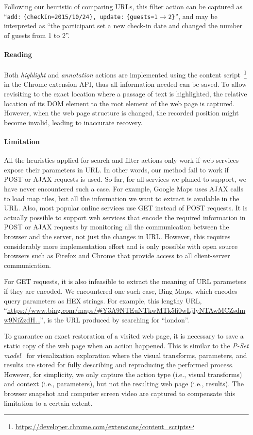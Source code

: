Following our heuristic of comparing URLs, this filter action can be captured as ``\texttt{add:} \texttt{\{checkIn=2015/10/24\}, update:} \texttt{\{guests=1$\rightarrow$2\}}'', and may be interpreted as ``the participant set a new check-in date and changed the number of guests from 1 to 2''.

\paragraph{Reading} Both \emph{highlight} and \emph{annotation} actions are implemented using the content script~\footnote{\url{https://developer.chrome.com/extensions/content_scripts}} in the Chrome extension API, thus all information needed can be saved. To allow revisiting to the exact location where a passage of text is highlighted, the relative location of its DOM element to the root element of the web page is captured. However, when the web page structure is changed, the recorded position might become invalid, leading to inaccurate recovery.

\paragraph{Limitation} All the heuristics applied for search and filter actions only work if web services expose their parameters in URL. In other words, our method fail to work if POST or AJAX requests is used. So far, for all services we planed to support, we have never encountered such a case. For example, Google Maps uses AJAX calls to load map tiles, but all the information we want to extract is available in the URL. Also, most popular online services use GET instead of POST requests. It is actually possible to support web services that encode the required information in POST or AJAX requests by monitoring all the communication between the browser and the server, not just the changes in URL. However, this requires considerably more implementation effort and is only possible with open source browsers such as Firefox and Chrome that provide access to all client-server communication.

For GET requests, it is also infeasible to extract the meaning of URL parameters if they are encoded. We encountered one such case, Bing Maps, which encodes query parameters as HEX strings. For example, this lengthy URL, ``\url{https://www.bing.com/maps/#Y3A9NTEuNTkwMTk5fi0wLjIyNTAwMCZsdmw9NiZzdH...}'', is the URL produced by searching for ``london''.

To guarantee an exact restoration of a visited web page, it is necessary to save a static copy of the web page when an action happened. This is similar to the \emph{P-Set model}~\cite{Jankun-Kelly2007} for visualization exploration where the visual transforms, parameters, and results are stored for fully describing and reproducing the performed process. However, for simplicity, we only capture the action type (i.e., visual transforms) and context (i.e., parameters), but not the resulting web page (i.e., results). The browser snapshot and computer screen video are captured to compensate this limitation to a certain extent.